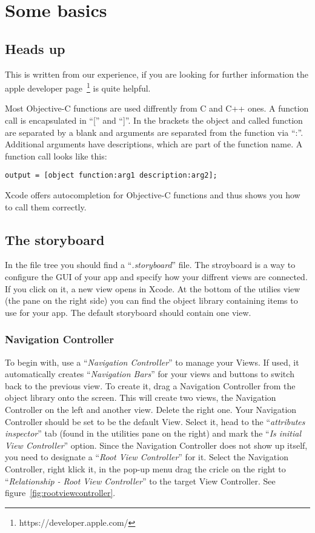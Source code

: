 \section{Some basics}
\label{sec:tutorial}

\subsection{Heads up}
\label{subsec:headsup}

This is written from our experience, if you are looking for further information the apple developer page~\footnote{https://developer.apple.com/} is quite helpful.

Most Objective-C functions are used diffrently from C and C++ ones. A function call is encapsulated in ``['' and ``]''. In the brackets the object and called function are separated by a blank and arguments are separated from the function via ``:''. Additional arguments have descriptions, which are part of the function name. A function call looks like this:

\begin{lstlisting}
output = [object function:arg1 description:arg2];
\end{lstlisting}

Xcode offers autocompletion for Objective-C functions and thus shows you how to call them correctly.

\subsection{The storyboard}
\label{subsec:storyboard}
In the file tree you should find a ``\textit{.storyboard}'' file. The stroyboard is a way to configure the GUI of your app and specify how your diffrent views are connected. If you click on it, a new view opens in Xcode. At the bottom of the utilies view (the pane on the right side) you can find the object library containing items to use for your app. The default storyboard should contain one view.

\subsubsection{Navigation Controller}
\label{subsubsec:navigationController}
To begin with, use a ``\textit{Navigation Controller}'' to manage your Views. If used, it automatically creates ``\textit{Navigation Bars}'' for your views and buttons to switch back to the previous view. To create it, drag a Navigation Controller from the object library onto the screen. This will create two views, the Navigation Controller on the left and another view. Delete the right one. Your Navigation Controller should be set to be the default View. Select it, head to the ``\textit{attributes inspector}'' tab (found in the utilities pane on the right) and mark the ``\textit{Is initial View Controller}'' option. Since the Navigation Controller does not show up itself, you need to designate a ``\textit{Root View Controller}'' for it. Select the Navigation Controller, right klick it, in the pop-up menu drag the cricle on the right to ``\textit{Relationship - Root View Controller}'' to the target View Controller. See figure~\ref{fig:rootviewcontroller}.

